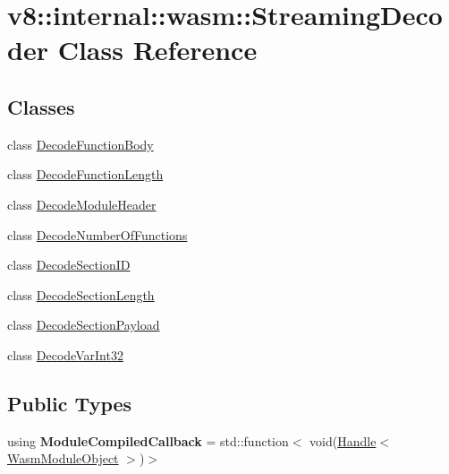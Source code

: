 \hypertarget{classv8_1_1internal_1_1wasm_1_1StreamingDecoder}{}\section{v8\+:\+:internal\+:\+:wasm\+:\+:Streaming\+Decoder Class Reference}
\label{classv8_1_1internal_1_1wasm_1_1StreamingDecoder}
\subsection*{Classes}
\begin{DoxyCompactItemize}
\item 
class \mbox{\hyperlink{classv8_1_1internal_1_1wasm_1_1StreamingDecoder_1_1DecodeFunctionBody}{Decode\+Function\+Body}}
\item 
class \mbox{\hyperlink{classv8_1_1internal_1_1wasm_1_1StreamingDecoder_1_1DecodeFunctionLength}{Decode\+Function\+Length}}
\item 
class \mbox{\hyperlink{classv8_1_1internal_1_1wasm_1_1StreamingDecoder_1_1DecodeModuleHeader}{Decode\+Module\+Header}}
\item 
class \mbox{\hyperlink{classv8_1_1internal_1_1wasm_1_1StreamingDecoder_1_1DecodeNumberOfFunctions}{Decode\+Number\+Of\+Functions}}
\item 
class \mbox{\hyperlink{classv8_1_1internal_1_1wasm_1_1StreamingDecoder_1_1DecodeSectionID}{Decode\+Section\+ID}}
\item 
class \mbox{\hyperlink{classv8_1_1internal_1_1wasm_1_1StreamingDecoder_1_1DecodeSectionLength}{Decode\+Section\+Length}}
\item 
class \mbox{\hyperlink{classv8_1_1internal_1_1wasm_1_1StreamingDecoder_1_1DecodeSectionPayload}{Decode\+Section\+Payload}}
\item 
class \mbox{\hyperlink{classv8_1_1internal_1_1wasm_1_1StreamingDecoder_1_1DecodeVarInt32}{Decode\+Var\+Int32}}
\end{DoxyCompactItemize}
\subsection*{Public Types}
\begin{DoxyCompactItemize}
\item 
\mbox{\label{classv8_1_1internal_1_1wasm_1_1StreamingDecoder_acea0d8adb726e22028153b725fafcfae}} 
using {\bfseries Module\+Compiled\+Callback} = std\+::function$<$ void(\mbox{\hyperlink{classv8_1_1internal_1_1Handle}{Handle}}$<$ \mbox{\hyperlink{classv8_1_1internal_1_1WasmModuleObject}{Wasm\+Module\+Object}} $>$)$>$
\end{DoxyCompactItemize}
